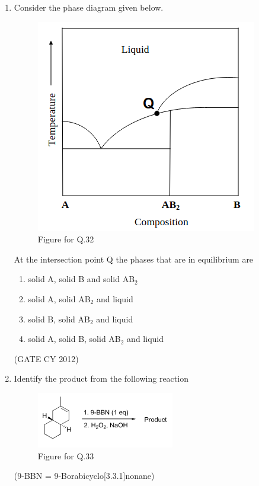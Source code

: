 \documentclass[12pt]{article}
\begin{document}
\begin{enumerate}
\item Consider the phase diagram given below.  

\begin{figure}[H]
    \centering
    \includegraphics[width=0.45\columnwidth]{figs/q32.png}
    \caption{Figure for Q.32}
    \label{fig:q32}
\end{figure}

At the intersection point Q the phases that are in equilibrium are  

\begin{enumerate}
    \item solid A, solid B and solid AB$_2$
    \item solid A, solid AB$_2$ and liquid
    \item solid B, solid AB$_2$ and liquid
    \item solid A, solid B, solid AB$_2$ and liquid
\end{enumerate}
\hfill (GATE CY 2012)


\item Identify the product from the following reaction  

\begin{figure}[H]
    \centering
    \includegraphics[width=0.4\columnwidth]{figs/q33.png}
    \caption{Figure for Q.33}
    \label{fig:q33}
\end{figure}

(9-BBN = 9-Borabicyclo[3.3.1]nonane)  


\end{enumerate}
\end{document}
